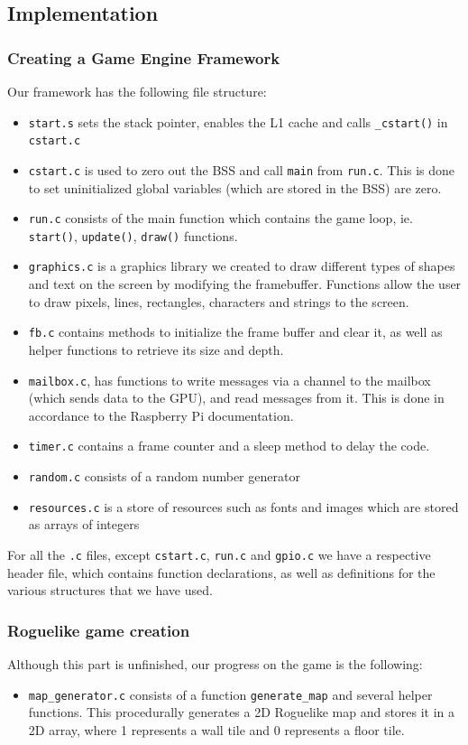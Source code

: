 \documentclass[11pt]{article}
\begin{document}
\subsection{Implementation}
\subsubsection{Creating a Game Engine Framework}
Our framework has the following file structure:
\begin{itemize}
    \item \texttt{start.s} sets the stack pointer, enables the L1 cache and calls \texttt{\_cstart()} in \texttt{cstart.c}
    \item \texttt{cstart.c} is used to zero out the BSS and call \texttt{main} from \texttt{run.c}. This is done to set uninitialized global variables (which are stored in the BSS) are zero.
    \item \texttt{run.c} consists of the main function which contains the game loop, ie. \texttt{start()}, \texttt{update()}, \texttt{draw()} functions.
    \item \texttt{graphics.c} is a graphics library we created to draw different types of shapes and text on the screen by modifying the framebuffer. Functions allow the user to draw pixels, lines, rectangles, characters and strings to the screen.
    \item \texttt{fb.c} contains methods to initialize the frame buffer and clear it, as well as helper functions to retrieve its size and depth.
    \item \texttt{mailbox.c}, has functions to write messages via a channel to the mailbox (which sends data to the GPU), and read messages from it. This is done in accordance to the Raspberry Pi documentation.
    \item \texttt{timer.c} contains a frame counter and a sleep method to delay the code.
    \item \texttt{random.c} consists of a random number generator
    \item \texttt{resources.c} is a store of resources such as fonts and images which are stored as arrays of integers
\end{itemize}

For all the \texttt{.c} files, except \texttt{cstart.c}, \texttt{run.c} and \texttt{gpio.c} we have a respective header file, which contains function declarations, as well as definitions for the various structures that we have used.

\subsubsection{Roguelike game creation}
Although this part is unfinished, our progress on the game is the following:
\begin{itemize}
    \item \texttt{map\_generator.c} consists of a function \texttt{generate\_map} and several helper functions. This procedurally generates a 2D Roguelike map and stores it in a 2D array, where 1 represents a wall tile and 0 represents a floor tile.
\end{itemize}
\end{document}
